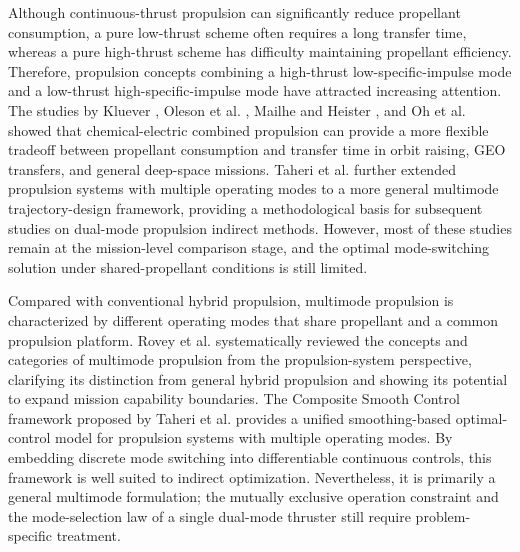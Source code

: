 ﻿\documentclass{IEEEtaes}
\begin{document}
Although continuous-thrust propulsion can significantly reduce propellant consumption, a pure low-thrust scheme often requires a long transfer time, whereas a pure high-thrust scheme has difficulty maintaining propellant efficiency. Therefore, propulsion concepts combining a high-thrust low-specific-impulse mode and a low-thrust high-specific-impulse mode have attracted increasing attention. The studies by Kluever \cite{kluever1995,kluever2012}, Oleson et al. \cite{oleson1997}, Mailhe and Heister \cite{mailhe2002}, and Oh et al. \cite{oh2004} showed that chemical-electric combined propulsion can provide a more flexible tradeoff between propellant consumption and transfer time in orbit raising, GEO transfers, and general deep-space missions. Taheri et al. \cite{taheri2020b} further extended propulsion systems with multiple operating modes to a more general multimode trajectory-design framework, providing a methodological basis for subsequent studies on dual-mode propulsion indirect methods. However, most of these studies remain at the mission-level comparison stage, and the optimal mode-switching solution under shared-propellant conditions is still limited.

Compared with conventional hybrid propulsion, multimode propulsion is characterized by different operating modes that share propellant and a common propulsion platform. Rovey et al. \cite{rovey2020} systematically reviewed the concepts and categories of multimode propulsion from the propulsion-system perspective, clarifying its distinction from general hybrid propulsion and showing its potential to expand mission capability boundaries. The Composite Smooth Control framework proposed by Taheri et al. \cite{taheri2020a,taheri2020b} provides a unified smoothing-based optimal-control model for propulsion systems with multiple operating modes. By embedding discrete mode switching into differentiable continuous controls, this framework is well suited to indirect optimization. Nevertheless, it is primarily a general multimode formulation; the mutually exclusive operation constraint and the mode-selection law of a single dual-mode thruster still require problem-specific treatment.
\end{document}
